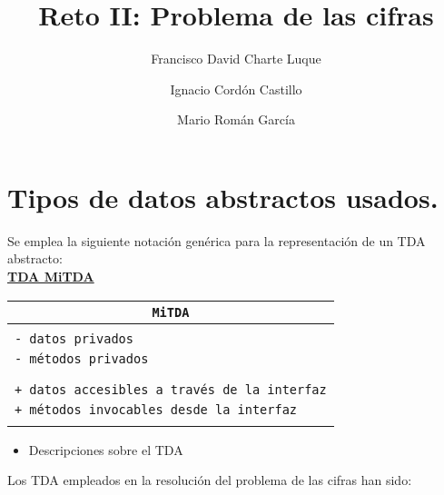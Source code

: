 \documentclass[a4paper,10pt]{scrartcl}
\title{Reto II: Problema de las cifras}
\author{Francisco David Charte Luque \and 
        Ignacio Cordón Castillo \and
        Mario Román García}
\date{}
\newcommand{\objeto}[4]{\indent\underline{\textbf{TDA #1}}
            \begin{center}\begin{tabular}{|p{7cm}|}
                 \hline
                 \multicolumn{1}{|c|}{\texttt{#1}}\\
                 \hline
                  \\#2\\\\
                 \hline
                 \\#3\\\\
                 \hline
            \end{tabular}\end{center}
            \begin{itemize}
            #4
            \end{itemize}
               }
\def\C++#1{\texttt{#1}}
\begin{document}
\maketitle


\section{Tipos de datos abstractos usados.}

Se emplea la siguiente notación genérica para la representación 
de un TDA abstracto:\\

\objeto{MiTDA}{
		\C++{- datos privados}\\
		\C++{- métodos privados}
	}{
		\C++{+ datos accesibles a través de la interfaz}\\
		\C++{+ métodos invocables desde la interfaz}
	}{\item Descripciones sobre el TDA}

\bigskip
Los TDA empleados en la resolución del problema de las cifras han sido:\\
\end{document}
